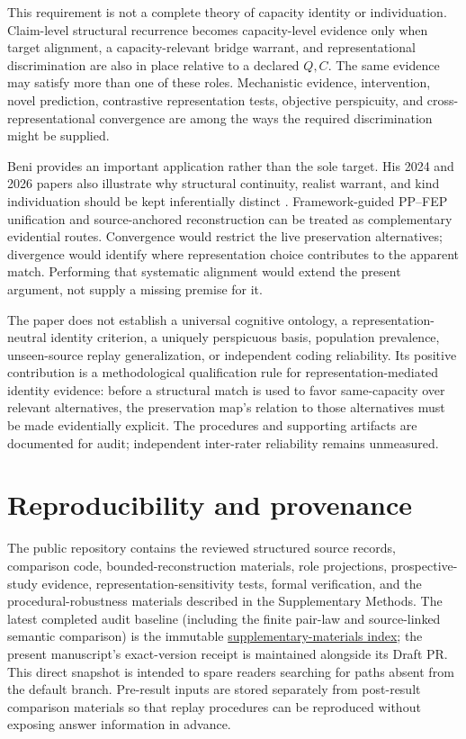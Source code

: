 \documentclass[11pt]{article}
\begin{document}
This requirement is not a complete theory of capacity identity or individuation. Claim-level structural recurrence becomes capacity-level evidence only when target alignment, a capacity-relevant bridge warrant, and representational discrimination are also in place relative to a declared \(Q,C\). The same evidence may satisfy more than one of these roles. Mechanistic evidence, intervention, novel prediction, contrastive representation tests, objective perspicuity, and cross-representational convergence are among the ways the required discrimination might be supplied.

Beni provides an important application rather than the sole target. His 2024 and 2026 papers also illustrate why structural continuity, realist warrant, and kind individuation should be kept inferentially distinct \citep{Beni2024StructuralRealismFEP,Beni2026KindsWithoutStructure}. Framework-guided PP--FEP unification and source-anchored reconstruction can be treated as complementary evidential routes. Convergence would restrict the live preservation alternatives; divergence would identify where representation choice contributes to the apparent match. Performing that systematic alignment would extend the present argument, not supply a missing premise for it.

The paper does not establish a universal cognitive ontology, a representation-neutral identity criterion, a uniquely perspicuous basis, population prevalence, unseen-source replay generalization, or independent coding reliability. Its positive contribution is a methodological qualification rule for representation-mediated identity evidence: before a structural match is used to favor same-capacity over relevant alternatives, the preservation map's relation to those alternatives must be made evidentially explicit. The procedures and supporting artifacts are documented for audit; independent inter-rater reliability remains unmeasured.

\section*{Reproducibility and provenance}

The public repository contains the reviewed structured source records, comparison code, bounded-reconstruction materials, role projections, prospective-study evidence, representation-sensitivity tests, formal verification, and the procedural-robustness materials described in the Supplementary Methods. The latest completed audit baseline (including the finite pair-law and source-linked semantic comparison) is the immutable \href{https://github.com/rinsakamo/relay-theory/blob/23edd6a088b34a3b70cbffe9a80505ff7534c5b1/paper/venues/jgps/supplementary-materials-index.md}{supplementary-materials index}; the present manuscript's exact-version receipt is maintained alongside its Draft PR. This direct snapshot is intended to spare readers searching for paths absent from the default branch. Pre-result inputs are stored separately from post-result comparison materials so that replay procedures can be reproduced without exposing answer information in advance.
\end{document}
